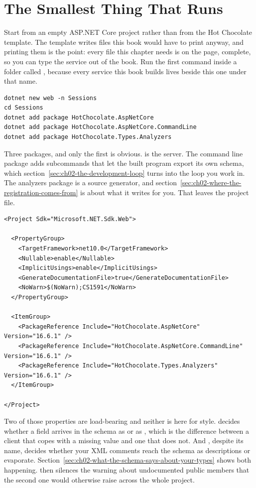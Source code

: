 \section{The Smallest Thing That Runs}
\label{sec:ch02-the-smallest-thing-that-runs}

Start from an empty ASP.NET Core project rather than from the Hot Chocolate
template. The template writes files this book would have to print anyway, and
printing them is the point: every file this chapter needs is on the page,
complete, so you can type the service out of the book. Run the first command
inside a folder called , because every service this book builds
lives beside this one under that name.

\begin{verbatim}
dotnet new web -n Sessions
cd Sessions
dotnet add package HotChocolate.AspNetCore
dotnet add package HotChocolate.AspNetCore.CommandLine
dotnet add package HotChocolate.Types.Analyzers
\end{verbatim}

%
Three packages, and only the first is obvious. 
is the server. The command line package adds subcommands that let the built
program export its own schema, which
section~\ref{sec:ch02-the-development-loop} turns into the loop you work in.
The analyzers package is a source generator, and
section~\ref{sec:ch02-where-the-registration-comes-from} is about what it
writes for you. That leaves the project file.

\begin{verbatim}
<Project Sdk="Microsoft.NET.Sdk.Web">

  <PropertyGroup>
    <TargetFramework>net10.0</TargetFramework>
    <Nullable>enable</Nullable>
    <ImplicitUsings>enable</ImplicitUsings>
    <GenerateDocumentationFile>true</GenerateDocumentationFile>
    <NoWarn>$(NoWarn);CS1591</NoWarn>
  </PropertyGroup>

  <ItemGroup>
    <PackageReference Include="HotChocolate.AspNetCore" Version="16.6.1" />
    <PackageReference Include="HotChocolate.AspNetCore.CommandLine" Version="16.6.1" />
    <PackageReference Include="HotChocolate.Types.Analyzers" Version="16.6.1" />
  </ItemGroup>

</Project>
\end{verbatim}

%
Two of those properties are load-bearing and neither is here for style.
 decides whether a field arrives in the schema as
 or as , which is the difference between a
client that copes with a missing value and one that does not. And
, despite its name, decides whether your
XML comments reach the schema as descriptions or evaporate.
Section~\ref{sec:ch02-what-the-schema-says-about-your-types} shows both
happening.  then silences the warning about undocumented
public members that the second one would otherwise raise across the whole
project.

